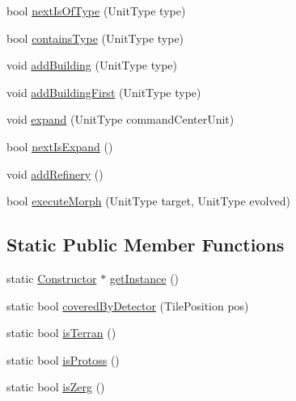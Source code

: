 \begin{DoxyCompactItemize}
\item 
bool \hyperlink{class_constructor_a27f427a0cf61618271bbd24df28631ea}{next\-Is\-Of\-Type} (Unit\-Type type)
\item 
bool \hyperlink{class_constructor_ad328a2ee63f98b4bfc5be446af43f00f}{contains\-Type} (Unit\-Type type)
\item 
void \hyperlink{class_constructor_a0b560d9aaee7c69dd1f0ef0b654db3a3}{add\-Building} (Unit\-Type type)
\item 
void \hyperlink{class_constructor_ad6974f94de127dbd8b7b8a0bb3441f24}{add\-Building\-First} (Unit\-Type type)
\item 
void \hyperlink{class_constructor_a876984ed1d24dbc7606bc668873bcb03}{expand} (Unit\-Type command\-Center\-Unit)
\item 
bool \hyperlink{class_constructor_a77ef10123014fa35e66c966ff3e65ad3}{next\-Is\-Expand} ()
\item 
void \hyperlink{class_constructor_a2da408f0a418e16c6ec9b34ebc106dfb}{add\-Refinery} ()
\item 
bool \hyperlink{class_constructor_a8a0a9a5044407f95b6a2227a373e5b0c}{execute\-Morph} (Unit\-Type target, Unit\-Type evolved)
\end{DoxyCompactItemize}
\subsection*{Static Public Member Functions}
\begin{DoxyCompactItemize}
\item 
static \hyperlink{class_constructor}{Constructor} $\ast$ \hyperlink{class_constructor_a757cc1671f52f15291b89772bef7aa98}{get\-Instance} ()
\item 
static bool \hyperlink{class_constructor_aec9731581892d7b443fa416da02b7f9d}{covered\-By\-Detector} (Tile\-Position pos)
\item 
static bool \hyperlink{class_constructor_a78b2ae365072317147e1a69fc74c3b2b}{is\-Terran} ()
\item 
static bool \hyperlink{class_constructor_a9a87f357e958559cfa13f880a416f1ff}{is\-Protoss} ()
\item 
static bool \hyperlink{class_constructor_aa5088eba73a05f25ae61d23471f17b2a}{is\-Zerg} ()
\end{DoxyCompactItemize}
